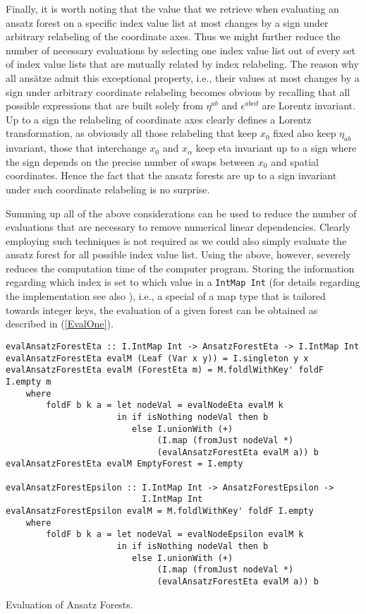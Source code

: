 Finally, it is worth noting that the value that we retrieve when evaluating an ansatz forest on a specific index value list at most changes by a sign under arbitrary relabeling of the coordinate axes. Thus we might further reduce the number of necessary evaluations by selecting one index value list out of every set of index value lists that are mutually related by index relabeling. The reason why all ansätze admit this exceptional property, i.e., their values at most changes by a sign under arbitrary coordinate relabeling becomes obvious by recalling that all possible expressions that are built solely from $\eta^{ab}$ and $\epsilon^{abcd}$ are Lorentz invariant. Up to a sign the relabeling of coordinate axes clearly defines a Lorentz transformation, as obviously all those relabeling that keep $x_0$ fixed also keep $\eta_{ab}$ invariant, those that interchange $x_0$ and $x_{\alpha}$ keep eta invariant up to a sign where the sign depends on the precise number of swaps between $x_0$ and spatial coordinates. Hence the fact that the ansatz forests are up to a sign invariant under such coordinate relabeling is no surprise. 

Summing up all of the above considerations can be used to reduce the number of evaluations that are necessary to remove numerical linear dependencies. Clearly employing such techniques is not required as we could also simply evaluate the ansatz forest for all possible index value list. Using the above, however, severely reduces the computation time of the computer program. 
Storing the information regarding which index is set to which value in a \texttt{IntMap Int} \cite{HackageIntMap} (for details regarding the implementation see also \cite{Okasaki98fastmergeable}), i.e., a special of a map type that is tailored towards integer keys, the evaluation of a given forest can be obtained as described in (\ref{EvalOne}).
\begin{listing}[hbt!]
\begin{verbatim}
evalAnsatzForestEta :: I.IntMap Int -> AnsatzForestEta -> I.IntMap Int
evalAnsatzForestEta evalM (Leaf (Var x y)) = I.singleton y x
evalAnsatzForestEta evalM (ForestEta m) = M.foldlWithKey' foldF I.empty m
    where
        foldF b k a = let nodeVal = evalNodeEta evalM k
                      in if isNothing nodeVal then b
                         else I.unionWith (+)
                              (I.map (fromJust nodeVal *)
                              (evalAnsatzForestEta evalM a)) b
evalAnsatzForestEta evalM EmptyForest = I.empty

evalAnsatzForestEpsilon :: I.IntMap Int -> AnsatzForestEpsilon ->
                           I.IntMap Int
evalAnsatzForestEpsilon evalM = M.foldlWithKey' foldF I.empty
    where
        foldF b k a = let nodeVal = evalNodeEpsilon evalM k
                      in if isNothing nodeVal then b
                         else I.unionWith (+) 
                              (I.map (fromJust nodeVal *)
                              (evalAnsatzForestEta evalM a)) b  
\end{verbatim} 
\caption{Evaluation of Ansatz Forests.}\label{EvalOne}
\end{listing}

